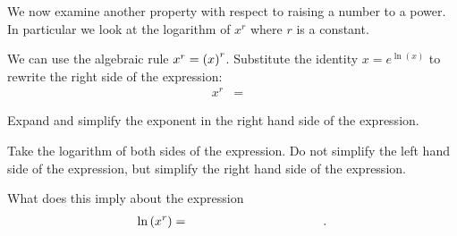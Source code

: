 \begin{problem}
\item We now examine another property with respect to raising a number
  to a power. In particular we look at the logarithm of $x^r$ where
  $r$ is a constant.
  \begin{subproblem}
  \item We can use the algebraic rule $x^r=\left( x \right)^r$. Substitute
    the identity $x=e^{\ln(x)}$ to rewrite the right side of the
    expression:
    \begin{eqnarray}
      \label{eqn:exponentialMultiplication}
      x^r & = & 
    \end{eqnarray}
    \item Expand and simplify the exponent in the right hand side of
      the expression.
      \vfill
    \item Take the logarithm of both sides of the expression. Do not
      simplify the left hand side of the expression, but simplify the
      right hand side of the expression.
      \vfill
    \item What does this imply about the expression
    \begin{eqnarray*}
      \ln\lp x^r \rp & = & \hspace{10em}.
    \end{eqnarray*}
  \end{subproblem}


\end{problem}

\postClass

